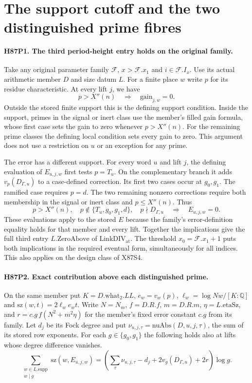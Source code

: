 \section{The support cutoff and the two distinguished prime fibres}

\paragraph{H87P1. The third period-height entry holds on the original family.}
Take any original parameter family $\mathcal F$, $x>\mathcal F.x_1$
and $i\in\mathcal F.I_x$. Use its actual arithmetic member $D$ and
size datum $L$. For a finite place $w$ write $p$ for its residue
characteristic. At every lift $j$, we have
\[
 p>X''(n)\quad\Longrightarrow\quad \mathrm{gain}_{j,w}=0.
\]
Outside the stored finite support this is the defining support
condition. Inside the support, primes in the signal or inert class use
the member's filled gain formula, whose first case sets the gain to
zero whenever $p>X''(n)$. For the remaining prime classes the
defining local condition sets every gain to zero. This argument does
not use a restriction on $u$ or an exception for any prime.

The error has a different support. For every word $u$ and lift $j$,
the defining evaluation of $E_{u,j,w}$ first tests $p=T_u$.
On the complementary branch it adds $v_p(D_{\Gamma,u})$ to a
case-defined correction. Its first two cases occur at $g_0,g_1$.
The ramified case requires $p=d$. The two remaining nonzero
corrections require both membership in the signal or inert class
and $p\le X''(n)$. Thus
\[
 p>X''(n),\quad p\notin\{T_u,g_0,g_1,d\},\quad
        p\nmid D_{\Gamma,u}
 \quad\Longrightarrow\quad E_{u,j,w}=0 .
\]
These evaluations apply to the stored $E$ because the family's
error-definition equality holds for that member and every lift.
Together the implications give the full third entry
$L.\mathrm{ZeroAbove}$ of $\mathrm{LinkDIV}_{\mathrm{at}}$.
The threshold $x_0=\mathcal F.x_1+1$ puts both implications in
the required eventual form, simultaneously for all indices. This
also applies on the design class of X87S4.

\paragraph{H87P2. Exact contribution above each distinguished prime.}
On the same member put $K=D.\mathrm{what}_2.LL$,
$e_w=v_w(p)$, $\ell_w=\log Nw/[K:\mathbb Q]$ and
$\mathrm{sz}(w,t)=2\ell_we_wt$.
Write $N=N_m$, $f=D.R.f$, $m=D.R.m$, $\eta=L.\mathrm{etaSz}$,
and $r=c.g\, f(N^2+m^2\eta)$ for the member's fixed error constant
$c.g$ from its family. Let $d_j$ be its Fock degree and put
$\nu_{u,j,\tau}=\mathrm{nuAbs}(D,u,j,\tau)$, the sum of its
stored row exponents. For each $g\in\{g_0,g_1\}$ the following
holds also at lifts whose degree difference vanishes.
\[
 \sum_{\substack{w\in L.\mathrm{supp}\\w\mid g}}
       \mathrm{sz}(w,E_{u,j,w})
  =\left(\sum_\tau\nu_{u,j,\tau}-d_j+
                     2v_g(D_{\Gamma,u})+2r\right)\log g .
\]


